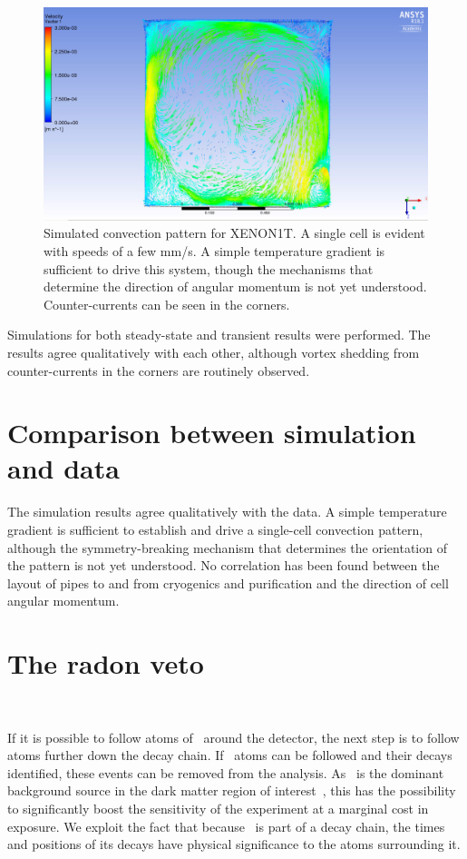 \begin{figure}[htb]
\centering
\includegraphics[width=\textwidth]{figures/rnveto/convection_sim}
\caption{ Simulated convection pattern for XENON1T. A single cell is evident with speeds of a few mm/s. A simple temperature gradient is sufficient to drive this system, though the mechanisms that determine the direction of angular momentum is not yet understood. Counter-currents can be seen in the corners.}\label{fig:cfd_sample}
\end{figure}

Simulations for both steady-state and transient results were performed. The results agree qualitatively with each other, although vortex shedding from counter-currents in the corners are routinely observed.

\section{Comparison between simulation and data}

The simulation results agree qualitatively with the data. A simple temperature gradient is sufficient to establish and drive a single-cell convection pattern, although the symmetry-breaking mechanism that determines the orientation of the pattern is not yet understood. No correlation has been found between the layout of pipes to and from cryogenics and purification and the direction of cell angular momentum.

\section{The radon veto}~\label{sec:rnveto}

If it is possible to follow atoms of \Po~around the detector, the next step is to follow atoms further down the decay chain. If \Pb~atoms can be followed and their decays identified, these events can be removed from the analysis. As \Pb~is the dominant background source in the dark matter region of interest~\cite{Aprile:2015uzo}, this has the possibility to significantly boost the sensitivity of the experiment at a marginal cost in exposure. We exploit the fact that because \Pb~is part of a decay chain, the times and positions of its decays have physical significance to the atoms surrounding it.

